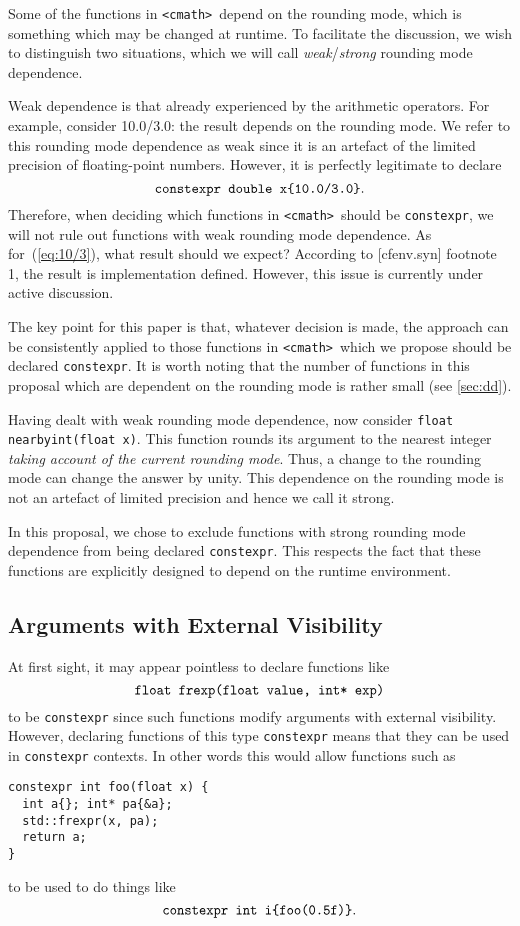 \documentclass[prd,twocolumn,amsmath,amssymb,nofootinbib,eqsecnum]{revtex4-1}
\newcommand{\constexpr}{\code{constexpr}\xspace}
\newcommand{\code}[1]{{\tt #1}}
\newcommand{\header}[1]{{\tt <#1>}}
\newcommand{\cmath}{\header{cmath}}
\newcommand{\eq}[1]{(\ref{eq:#1})}
\begin{document}
Some of the functions in \cmath\ depend on the rounding mode, which is something which may be changed at runtime. To facilitate the discussion, we wish to distinguish two situations, which we will call \emph{weak}/\emph{strong} rounding mode dependence. 

Weak dependence is that already experienced by the arithmetic operators. For example, consider 10.0/3.0: the result depends on the rounding mode. We refer to this rounding mode dependence as weak since it is an artefact of the limited precision of floating-point numbers. However, it is perfectly legitimate to declare
\begin{equation}
	\mbox{\code{constexpr double x\{10.0/3.0\}}}.
\label{eq:10/3}
\end{equation}
Therefore, when deciding which functions in \cmath\ should be \constexpr, we will not rule out functions with weak rounding mode dependence.
As for~\eq{10/3}, what result should we expect? According to [cfenv.syn] footnote 1, the result is implementation defined. However, this issue is currently under active discussion. 

The key point for this paper is that, whatever decision is made, the approach can be consistently applied to those functions in \cmath\ which we propose should be declared \constexpr. It is worth noting that the number of functions in this proposal which are dependent on the rounding mode is rather small (see \ref{sec:dd}).

Having dealt with weak rounding mode dependence, now consider \code{float nearbyint(float x)}. This function rounds its argument to the nearest integer \emph{taking account of the current rounding mode}. Thus, a change to the rounding mode can change the answer by unity. This dependence on the rounding mode is not an artefact of limited precision and hence we call it strong.

In this proposal, we chose to exclude functions with strong rounding mode dependence from being declared \constexpr. This respects the fact that these functions are explicitly designed to depend on the runtime environment.

\subsection{Arguments with External Visibility}
\label{sec:external}

At first sight, it may appear pointless to declare functions like
\[
	\mbox{\code{float frexp(float value, int* exp)}}
\]
to be \constexpr since such functions modify arguments with external visibility.
However, declaring functions of this type \constexpr means that they can be used
in \constexpr contexts. In other words this would allow functions such as
\begin{Verbatim}
constexpr int foo(float x) {
  int a{}; int* pa{&a};
  std::frexpr(x, pa);
  return a;
}
\end{Verbatim}	
to be used to do things like
\[
	\mbox{\code{constexpr int i\{foo(0.5f)\}}}.
\]
\end{document}
